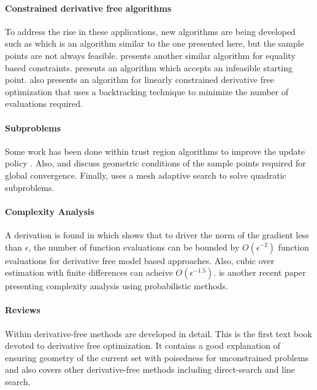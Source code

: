 \paragraph{Constrained derivative free algorithms}
To address the rise in these applications, new algorithms are being developed such as \cite{doi:10.1080/10556788.2015.1026968} which is an algorithm similar to the one presented here, but the sample points are not always feasible.
\cite{Troltzsch2016} presents another similar algorithm for equality based constraints.
\cite{infeasiblestarting} presents an algorithm which accepts an infeasible starting point.
\cite{Gao2018} also presents an algorithm for linearly constrained derivative free optimization that uses a backtracking technique to minimize the number of evaluations required.

\paragraph{Subproblems}
Some work has been done within trust region algorithms to improve the update policy \cite{Kamandi2017}.
Also, \cite{Verderio2017} and \cite{doi:10.1080/10556780802409296} discuss geometric conditions of the sample points required for global convergence.
Finally, \cite{AMAIOUA201813} uses a mesh adaptive search to solve quadratic subproblems.


\paragraph{Complexity Analysis}

A derivation is found in \cite{doi:10.1137/151005683} which shows that to driver the norm of the gradient less than $\epsilon$, the number of function evaluations can be bounded by $O(\epsilon^{-2})$ 
function evaluations for derivative free model based approaches. Also, cubic over estimation with finite differences can acheive $O(\epsilon^{-1.5})$. \cite{doi:10.1093/imanum/drx043} is another recent paper presenting complexity analysis using probabilistic methods.


\paragraph{Reviews}
Within \cite{DUMMY:intro_book} derivative-free methods are developed in detail.
This is the first text book devoted to derivative free optimization.
It contains a good explanation of ensuring geometry of the current set with poisedness for unconstrained problems and also covers other derivative-free methods including direct-search and line search.


